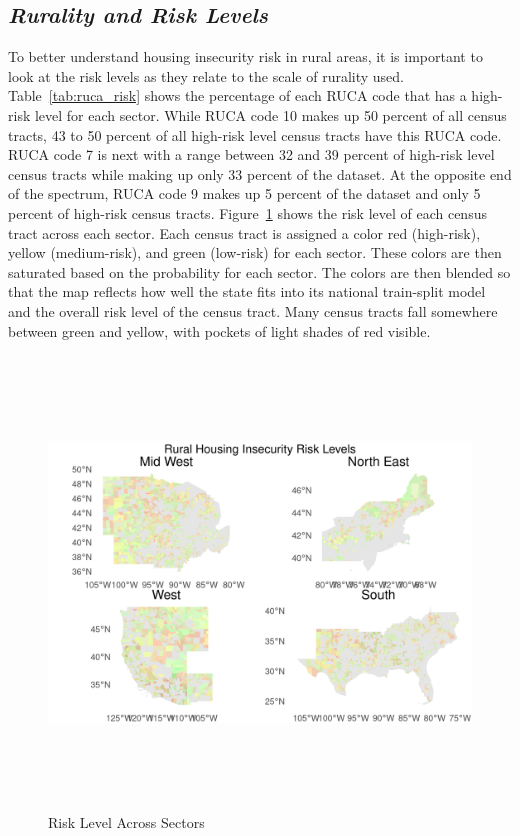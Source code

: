 \subsection{\textit{Rurality and Risk Levels}}
To better understand housing insecurity risk in rural areas, it is important to look at the risk levels as they relate to the scale of rurality used. Table~\ref{tab:ruca_risk} shows the percentage of each RUCA code that has a high-risk level for each sector. While RUCA code 10 makes up 50 percent of all census tracts, 43 to 50 percent of all high-risk level census tracts have this RUCA code. RUCA code 7 is next with a range between 32 and 39 percent of high-risk level census tracts while making up only 33 percent of the dataset. At the opposite end of the spectrum, RUCA code 9 makes up 5 percent of the dataset and only 5 percent of high-risk census tracts. Figure~\ref{fig:regional_map} shows the risk level of each census tract across each sector. Each census tract is assigned a color red (high-risk), yellow (medium-risk), and green (low-risk) for each sector. These colors are then saturated based on the probability for each sector. The colors are then blended so that the map reflects how well the state fits into its national train-split model and the overall risk level of the census tract. Many census tracts fall somewhere between green and yellow, with pockets of light shades of red visible. 



\begin{figure}[htbp]
    \centering
     \includegraphics[width=\textwidth, height=12cm]{plots/regional_map.png}
     \caption{Risk Level Across Sectors}
     \label{fig:regional_map}
 \end{figure}

